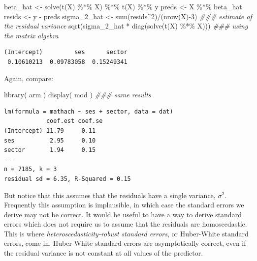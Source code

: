 \documentclass[
  letterpaper,
  DIV=11,
  numbers=noendperiod]{scrreprt}
\newenvironment{Shaded}{}{}
\newcommand{\DecValTok}[1]{\textcolor[rgb]{0.25,0.63,0.44}{#1}}
\newcommand{\DocumentationTok}[1]{\textcolor[rgb]{0.73,0.13,0.13}{\textit{#1}}}
\newcommand{\FunctionTok}[1]{\textcolor[rgb]{0.02,0.16,0.49}{#1}}
\newcommand{\NormalTok}[1]{#1}
\newcommand{\OtherTok}[1]{\textcolor[rgb]{0.00,0.44,0.13}{#1}}
\newcommand{\SpecialCharTok}[1]{\textcolor[rgb]{0.25,0.44,0.63}{#1}}
\begin{document}
\begin{Shaded}
\begin{Highlighting}[]
\NormalTok{beta\_hat }\OtherTok{\textless{}{-}} \FunctionTok{solve}\NormalTok{(}\FunctionTok{t}\NormalTok{(X) }\SpecialCharTok{\%*\%}\NormalTok{ X) }\SpecialCharTok{\%*\%} \FunctionTok{t}\NormalTok{(X) }\SpecialCharTok{\%*\%}\NormalTok{ y}
\NormalTok{preds }\OtherTok{\textless{}{-}}\NormalTok{ X }\SpecialCharTok{\%*\%}\NormalTok{ beta\_hat}
\NormalTok{resids }\OtherTok{\textless{}{-}}\NormalTok{ y }\SpecialCharTok{{-}}\NormalTok{ preds}
\NormalTok{sigma\_2\_hat }\OtherTok{\textless{}{-}} \FunctionTok{sum}\NormalTok{(resids}\SpecialCharTok{\^{}}\DecValTok{2}\NormalTok{)}\SpecialCharTok{/}\NormalTok{(}\FunctionTok{nrow}\NormalTok{(X)}\SpecialCharTok{{-}}\DecValTok{3}\NormalTok{) }\DocumentationTok{\#\#\# estimate of the residual variance}
\FunctionTok{sqrt}\NormalTok{(sigma\_2\_hat }\SpecialCharTok{*} \FunctionTok{diag}\NormalTok{(}\FunctionTok{solve}\NormalTok{(}\FunctionTok{t}\NormalTok{(X) }\SpecialCharTok{\%*\%}\NormalTok{ X))) }\DocumentationTok{\#\#\# using the matrix algebra}
\end{Highlighting}
\end{Shaded}

\begin{verbatim}
(Intercept)         ses      sector 
 0.10610213  0.09783058  0.15249341 
\end{verbatim}

Again, compare:

\begin{Shaded}
\begin{Highlighting}[]
\FunctionTok{library}\NormalTok{( arm )}
\FunctionTok{display}\NormalTok{( mod ) }\DocumentationTok{\#\#\# same results}
\end{Highlighting}
\end{Shaded}

\begin{verbatim}
lm(formula = mathach ~ ses + sector, data = dat)
            coef.est coef.se
(Intercept) 11.79     0.11  
ses          2.95     0.10  
sector       1.94     0.15  
---
n = 7185, k = 3
residual sd = 6.35, R-Squared = 0.15
\end{verbatim}

But notice that this assumes that the residuals have a single variance,
\(\sigma^2\). Frequently this assumption is implausible, in which case
the standard errors we derive may not be correct. It would be useful to
have a way to derive standard errors which does not require us to assume
that the residuals are homoscedastic. This is where
\emph{heteroscedasticity-robust standard errors}, or Huber-White
standard errors, come in. Huber-White standard errors are asymptotically
correct, even if the residual variance is not constant at all values of
the predictor.
\end{document}
